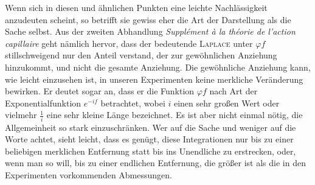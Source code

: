 Wenn sich in diesen und ähnlichen Punkten eine leichte Nachlässigkeit anzudeuten scheint, so betrifft sie gewiss eher die Art der Darstellung als die Sache selbst. Aus der zweiten Abhandlung \textit{Supplément à la théorie de l’action capillaire} geht nämlich hervor, dass der bedeutende \textsc{Laplace} unter $\varphi f$ stillschweigend nur den Anteil verstand, der zur gewöhnlichen Anziehung hinzukommt, und nicht die gesamte Anziehung. Die gewöhnliche Anziehung kann, wie leicht einzusehen ist, in unseren Experimenten keine merkliche Veränderung bewirken. Er deutet sogar an, dass er die Funktion $\varphi f$ nach Art der Exponentialfunktion $e^{-if}$ betrachtet, wobei $i$ einen sehr großen Wert oder vielmehr $\frac{1}{i}$ eine sehr kleine Länge bezeichnet. Es ist aber nicht einmal nötig, die Allgemeinheit so stark einzuschränken. Wer auf die Sache und weniger auf die Worte achtet, sieht leicht, dass es genügt, diese Integrationen nur bis zu einer beliebigen merklichen Entfernung statt bis ins Unendliche zu erstrecken, oder, wenn man so will, bis zu einer endlichen Entfernung, die größer ist als die in den Experimenten vorkommenden Abmessungen.


